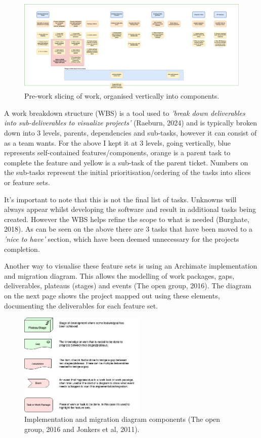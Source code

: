   \begin{figure}[H]
    \centering
    \includegraphics[width=14cm]{assets/schedulesSlicing.drawio.png}
    \caption{Pre-work slicing of work, organised vertically into components.}
    \label{fig:schedulesSlicing}
  \end{figure}

  A work breakdown structure (WBS) is a tool used to \textit{'break down deliverables into sub-deliverables to visualize projects'} (Raeburn, 2024) 
  and is typically broken down into 3 levels, parents, dependencies and sub-tasks, however it can consist of as a team wants. For the above I kept it 
  at 3 levels, going vertically, blue represents self-contained features/components, orange is a parent task to complete the feature and yellow is a 
  sub-task of the parent ticket. Numbers on the sub-tasks represent the initial prioritisation/ordering of the tasks into slices or feature sets.
  
  It's important to note that this is not the final list of tasks. Unknowns will always appear whilst developing the software and result in additional
  tasks being created. However the WBS helps refine the scope to what is needed (Burghate, 2018). As can be seen on the above there are 3 tasks that have 
  been moved to a \textit{'nice to have'} section, which have been deemed unnecessary for the projects completion.

  Another way to visualise these feature sets is using an Archimate implementation and migration diagram. This allows the modelling of work packages,
  gaps, deliverables, plateaus (stages) and events (The open group, 2016). The diagram on the next page shows the project mapped out using these elements, 
  documenting the deliverables for each feature set.

  \begin{figure}[H]
    \centering
    \includegraphics[width=6cm]{assets/migrationKey.drawio.png}
    \caption{Implementation and migration diagram components (The open group, 2016 and Jonkers et al, 2011).}
    \label{fig:migrationKey}
  \end{figure}

